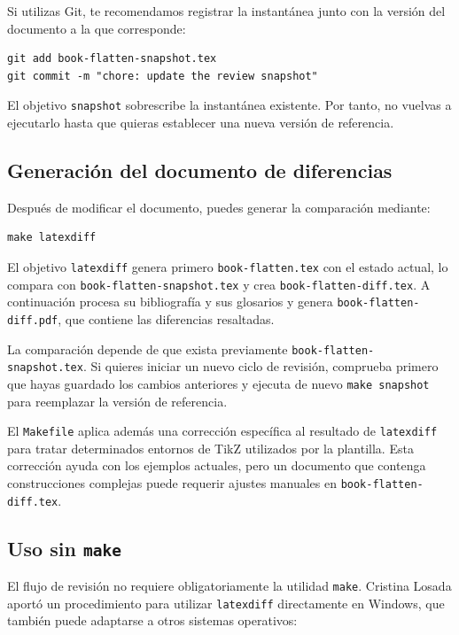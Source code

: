 Si utilizas Git, te recomendamos registrar la instantánea junto con la versión del documento a la que corresponde:

\begin{verbatim}
git add book-flatten-snapshot.tex
git commit -m "chore: update the review snapshot"
\end{verbatim}

El objetivo \texttt{snapshot} sobrescribe la instantánea existente. Por tanto, no vuelvas a ejecutarlo hasta que quieras establecer una nueva versión de referencia.

\subsection{Generación del documento de diferencias}

Después de modificar el documento, puedes generar la comparación mediante:

\begin{verbatim}
make latexdiff
\end{verbatim}

El objetivo \texttt{latexdiff} genera primero \texttt{book-flatten.tex} con el estado actual, lo compara con \texttt{book-flatten-snapshot.tex} y crea \texttt{book-flatten-diff.tex}. A continuación procesa su bibliografía y sus glosarios y genera \texttt{book-flatten-diff.pdf}, que contiene las diferencias resaltadas.

La comparación depende de que exista previamente \texttt{book-flatten-snapshot.tex}. Si quieres iniciar un nuevo ciclo de revisión, comprueba primero que hayas guardado los cambios anteriores y ejecuta de nuevo \texttt{make snapshot} para reemplazar la versión de referencia.

El \texttt{Makefile} aplica además una corrección específica al resultado de \texttt{latexdiff} para tratar determinados entornos de TikZ utilizados por la plantilla. Esta corrección ayuda con los ejemplos actuales, pero un documento que contenga construcciones complejas puede requerir ajustes manuales en \texttt{book-flatten-diff.tex}.

\subsection{Uso sin \texttt{make}}

El flujo de revisión no requiere obligatoriamente la utilidad \texttt{make}. Cristina Losada aportó un procedimiento para utilizar \texttt{latexdiff} directamente en Windows, que también puede adaptarse a otros sistemas operativos:

